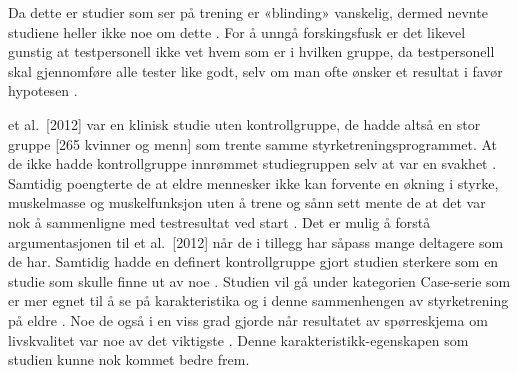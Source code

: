 \documentclass[
]{book}
\begin{document}
Da dette er studier som ser på trening er «blinding» vanskelig, dermed nevnte studiene heller ikke noe om dette \citetext{\citealp[ et al.~2012]{Geirsdottir}; \citealp[Johnen, and Holfelder 2019]{Schott}; \citealp[ et al.~2017]{Turpela}; \citealp[ et al.~2019]{vikberg}; \citealp[ et al.~2002]{vincent}}.
For å unngå forskingsfusk er det likevel gunstig at testpersonell ikke vet hvem som er i hvilken gruppe, da testpersonell skal gjennomføre alle tester like godt, selv om man ofte ønsker et resultat i favør hypotesen \citep[ 2013, s.
148-149]{Hulley}.

\citet{Geirsdottir} et al.~{[}2012{]} var en klinisk studie uten kontrollgruppe, de hadde altså en stor gruppe {[}265 kvinner og menn{]} som trente samme styrketreningsprogrammet.
At de ikke hadde kontrollgruppe innrømmet studiegruppen selv at var en svakhet \citep[ et al.~2012]{Geirsdottir}.
Samtidig poengterte de at eldre mennesker ikke kan forvente en økning i styrke, muskelmasse og muskelfunksjon uten å trene og sånn sett mente de at det var nok å sammenligne med testresultat ved start \citep[ et al.~2012]{Geirsdottir}.
Det er mulig å forstå argumentasjonen til \citet{Geirsdottir} et al.~{[}2012{]} når de i tillegg har såpass mange deltagere som de har.
Samtidig hadde en definert kontrollgruppe gjort studien sterkere som en studie som skulle finne ut av noe \citep[ 2013, s.
87]{Hulley}.
Studien vil gå under kategorien Case-serie som er mer egnet til å se på karakteristika og i denne sammenhengen av styrketrening på eldre \citep[ 2013, s.
87]{Hulley}.
Noe de også i en viss grad gjorde når resultatet av spørreskjema om livskvalitet var noe av det viktigste \citep[ et al.~2012]{Geirsdottir}.
Denne karakteristikk-egenskapen som studien kunne nok kommet bedre frem.
\end{document}
